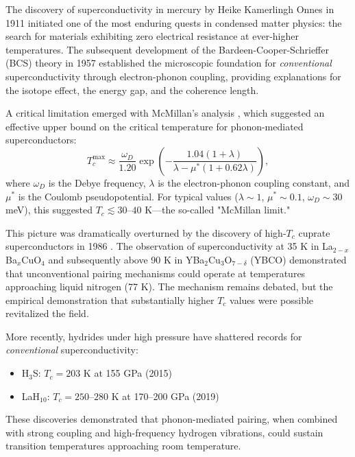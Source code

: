 \documentclass[11pt,a4paper]{article}
\theoremstyle{definition}
\begin{document}
The discovery of superconductivity in mercury by Heike Kamerlingh Onnes in 1911 \cite{onnes1911} initiated one of the most enduring quests in condensed matter physics: the search for materials exhibiting zero electrical resistance at ever-higher temperatures. The subsequent development of the Bardeen-Cooper-Schrieffer (BCS) theory in 1957 \cite{bcs1957} established the microscopic foundation for \textit{conventional} superconductivity through electron-phonon coupling, providing explanations for the isotope effect, the energy gap, and the coherence length.

A critical limitation emerged with McMillan's analysis \cite{mcmillan1968}, which suggested an effective upper bound on the critical temperature for phonon-mediated superconductors:
\begin{equation}\label{eq:mcmillan}
T_c^{\text{max}} \approx \frac{\omega_D}{1.20} \exp\left(-\frac{1.04(1+\lambda)}{\lambda - \mu^*(1+0.62\lambda)}\right),
\end{equation}
where $\omega_D$ is the Debye frequency, $\lambda$ is the electron-phonon coupling constant, and $\mu^*$ is the Coulomb pseudopotential. For typical values ($\lambda \sim 1$, $\mu^* \sim 0.1$, $\omega_D \sim 30$ meV), this suggested $T_c \lesssim 30$--$40$ K—the so-called "McMillan limit."

This picture was dramatically overturned by the discovery of high-$T_c$ cuprate superconductors in 1986 \cite{bednorz1986}. The observation of superconductivity at 35 K in La$_{2-x}$Ba$_x$CuO$_4$ and subsequently above 90 K in YBa$_2$Cu$_3$O$_{7-\delta}$ (YBCO) \cite{wu1987} demonstrated that unconventional pairing mechanisms could operate at temperatures approaching liquid nitrogen (77 K). The mechanism remains debated, but the empirical demonstration that substantially higher $T_c$ values were possible revitalized the field.

More recently, hydrides under high pressure have shattered records for \textit{conventional} superconductivity:
\begin{itemize}
\item H$_3$S: $T_c = 203$ K at 155 GPa (2015) \cite{drozdov2015}
\item LaH$_{10}$: $T_c = 250$--$280$ K at 170--200 GPa (2019) \cite{somayazulu2019,drozdov2019}
\end{itemize}
These discoveries demonstrated that phonon-mediated pairing, when combined with strong coupling and high-frequency hydrogen vibrations, could sustain transition temperatures approaching room temperature.
\end{document}
